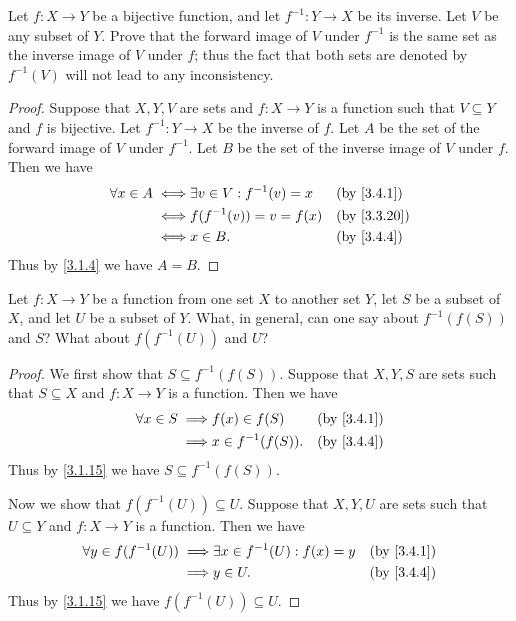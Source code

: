 \exercisesection

\begin{ex}\label{ex:3.4.1}
  Let \(f : X \to Y\) be a bijective function, and let \(f^{-1} : Y \to X\) be its inverse.
  Let \(V\) be any subset of \(Y\).
  Prove that the forward image of \(V\) under \(f^{-1}\) is the same set as the inverse image of \(V\) under \(f\);
  thus the fact that both sets are denoted by \(f^{-1}(V)\) will not lead to any inconsistency.
\end{ex}

\begin{proof}
  Suppose that \(X, Y, V\) are sets and \(f : X \to Y\) is a function such that \(V \subseteq Y\) and \(f\) is bijective.
  Let \(f^{-1} : Y \to X\) be the inverse of \(f\).
  Let \(A\) be the set of the forward image of \(V\) under \(f^{-1}\).
  Let \(B\) be the set of the inverse image of \(V\) under \(f\).
  Then we have
  \begin{align*}
    \forall x \in A \iff & \exists v \in V : f^{-1}(v) = x &  & \by{3.4.1}  \\
    \iff                 & f(f^{-1}(v)) = v = f(x)         &  & \by{3.3.20} \\
    \iff                 & x \in B.                        &  & \by{3.4.4}
  \end{align*}
  Thus by \cref{3.1.4} we have \(A = B\).
\end{proof}

\begin{ex}\label{ex:3.4.2}
  Let \(f : X \to Y\) be a function from one set \(X\) to another set \(Y\), let \(S\) be a subset of \(X\), and let \(U\) be a subset of \(Y\).
  What, in general, can one say about \(f^{-1}(f(S))\) and \(S\)?
  What about \(f(f^{-1}(U))\) and \(U\)?
\end{ex}

\begin{proof}
  We first show that \(S \subseteq f^{-1}(f(S))\).
  Suppose that \(X, Y, S\) are sets such that \(S \subseteq X\) and \(f : X \to Y\) is a function.
  Then we have
  \begin{align*}
    \forall x \in S \implies & f(x) \in f(S)       &  & \by{3.4.1} \\
    \implies                 & x \in f^{-1}(f(S)). &  & \by{3.4.4}
  \end{align*}
  Thus by \cref{3.1.15} we have \(S \subseteq f^{-1}(f(S))\).

  Now we show that \(f(f^{-1}(U)) \subseteq U\).
  Suppose that \(X, Y, U\) are sets such that \(U \subseteq Y\) and \(f : X \to Y\) is a function.
  Then we have
  \begin{align*}
    \forall y \in f(f^{-1}(U)) \implies & \exists x \in f^{-1}(U) : f(x) = y &  & \by{3.4.1} \\
    \implies                            & y \in U.                           &  & \by{3.4.4}
  \end{align*}
  Thus by \cref{3.1.15} we have \(f(f^{-1}(U)) \subseteq U\).
\end{proof}


